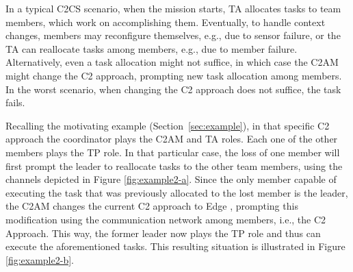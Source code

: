  

In a typical C2CS scenario, when the mission starts, TA allocates tasks to team members, which work on accomplishing them. Eventually, to handle context changes, members may reconfigure themselves, e.g., due to sensor failure, or \color{black}the TA \color{black} can reallocate tasks among members, e.g., due to member failure. Alternatively, even a task allocation might not suffice, in which case the C2AM might change the C2 approach, prompting new task allocation among members. \color{black}In the worst scenario, when changing the C2 approach does not suffice, the task fails.\color{black} 


Recalling the motivating example (Section~\ref{sec:example}), in that specific C2 approach the coordinator plays the C2AM and TA roles. Each one of the other members plays the TP role. In that particular case, the loss of one member will first prompt the leader to reallocate tasks to the other team members, using the channels depicted in Figure \ref{fig:example2-a}. 
 Since the only member capable of executing the task that was previously allocated to the lost member is the leader, the C2AM changes the current C2 approach to Edge \citep{FRANCE2014}, prompting this modification using the communication network among members, i.e., the C2 Approach. This way, the former leader now plays the TP role and thus can execute the aforementioned tasks. This resulting situation is illustrated in Figure \ref{fig:example2-b}.

